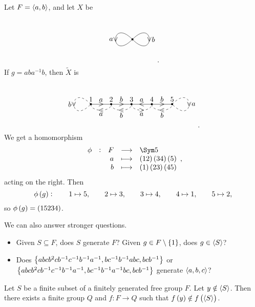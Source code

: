 \begin{example}
Let $ F = \left\langle a, b \right\rangle $, and let $ X $ be
$$
\begin{tikzpicture}
\fill (0, 0) circle (0.05);
\draw (0, 0) to [in=-135, out=135, distance=45] node{$ \vee $} node[left]{$ a $} (0, 0);
\draw (0, 0) to [in=-45, out=45, distance=45] node{$ \vee $} node[right]{$ b $} (0, 0);
\end{tikzpicture}.
$$
If $ g = aba^{-1}b $, then $ \widetilde{X} $ is
$$
\begin{tikzpicture}
\fill (1, 0) circle (0.05) node[above]{$ 1 $};
\fill (2, 0) circle (0.05) node[above]{$ 2 $};
\fill (3, 0) circle (0.05) node[above]{$ 3 $};
\fill (4, 0) circle (0.05) node[above]{$ 4 $};
\fill (5, 0) circle (0.05) node[above]{$ 5 $};
\draw (1, 0) to node{$ > $} node[above]{$ a $} (2, 0);
\draw (2, 0) to node{$ > $} node[above]{$ b $} (3, 0);
\draw (3, 0) to node{$ < $} node[above]{$ a $} (4, 0);
\draw (4, 0) to node{$ > $} node[above]{$ b $} (5, 0);
\draw [dashed] (1, 0) to [in=-135, out=135, distance=45] node{$ \vee $} node[left]{$ b $} (1, 0);
\draw [dashed] (1, 0) to [in=-90, out=-90] node{$ < $} node[below]{$ a $} (2, 0);
\draw [dashed] (2, 0) to [in=-90, out=-90] node{$ < $} node[below]{$ b $} (3, 0);
\draw [dashed] (3, 0) to [in=-90, out=-90] node{$ > $} node[below]{$ a $} (4, 0);
\draw [dashed] (4, 0) to [in=-90, out=-90] node{$ < $} node[below]{$ b $} (5, 0);
\draw [dashed] (5, 0) to [in=-45, out=45, distance=45] node{$ \vee $} node[right]{$ a $} (5, 0);
\end{tikzpicture}.
$$
We get a homomorphism
$$ \functions[\phi]{F}{\Sym 5}{a}{\br{12}\br{34}\br{5}}{b}{\br{1}\br{23}\br{45}}, $$
acting on the right. Then
$$ \phi\br{g} : \qquad 1 \mapsto 5, \qquad 2 \mapsto 3, \qquad 3 \mapsto 4, \qquad 4 \mapsto 1, \qquad 5 \mapsto 2, $$
so $ \phi\br{g} = \br{15234} $.
\end{example}

We can also answer stronger questions.
\begin{itemize}
\item Given $ S \subseteq F $, does $ S $ generate $ F $? Given $ g \in F \setminus \cbr{1} $, does $ g \in \left\langle S \right\rangle $?
\item Does $ \cbr{abcb^2cb^{-1}c^{-1}b^{-1}a^{-1}, bc^{-1}b^{-1}abc, bcb^{-1}} $ or $ \cbr{abcb^2cb^{-1}c^{-1}b^{-1}a^{-1}, bc^{-1}b^{-1}a^{-1}bc, bcb^{-1}} $ generate $ \left\langle a, b, c \right\rangle $?
\end{itemize}

\begin{theorem}
\label{thm:3.2.7}
Let $ S $ be a finite subset of a finitely generated free group $ F $. Let $ y \notin \left\langle S \right\rangle $. Then there exists a finite group $ Q $ and $ f : F \to Q $ such that $ f\br{y} \notin f\br{\abr{S}} $.
\end{theorem}


